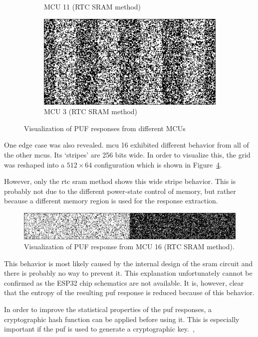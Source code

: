\begin{figure}[ht!]
\begin{subfigure}[b]{0.475\textwidth}
            \caption{MCU 11 (RTC SRAM method)}    
            \label{fig:mcu_11}
        \end{subfigure}
        \hfill
        \begin{subfigure}[b]{0.475\textwidth}   
            \centering 
            \includegraphics[width=\textwidth]{images/3_response_rtc.png}
            \caption{MCU 3 (RTC SRAM method)}    
            \label{fig:mcu_3}
        \end{subfigure}
        \caption{Visualization of PUF responses from different MCUs} 
        \label{fig:puf_response_visualization}
\end{figure}

One edge case was also revealed. \Gls{mcu} 16 exhibited different behavior from all of the other \glspl{mcu}. Its `stripes' are 256 bits wide. In order to visualize this, the grid was reshaped into a $512 \times 64$ configuration which is shown in Figure~\ref{fig:16_response_sleep}.

However, only the \gls{rtc} \gls{sram} method shows this wide stripe behavior. This is probably not due to the different power-state control of memory, but rather because a different memory region is used for the response extraction.

\begin{figure}[ht!]
    \centering
    \captionsetup{justification=centering,margin=0.5cm}
    \includegraphics[width=\textwidth]{images/16_response_sleep.png}
    \caption{Visualization of PUF response from MCU 16 (RTC SRAM method).}
    \label{fig:16_response_sleep}
\end{figure}

This behavior is most likely caused by the internal design of the \gls{sram} circuit and there is probably no way to prevent it. This explanation unfortunately cannot be confirmed as the ESP32 chip schematics are not available. It is, however, clear that the entropy of the resulting \gls{puf} response is reduced because of this behavior.

In order to improve the statistical properties of the \gls{puf} responses, a cryptographic hash function can be applied before using it. This is especially important if the \gls{puf} is used to generate a cryptographic key.~\cite{Sven2015},~\cite{Dodis2008}

